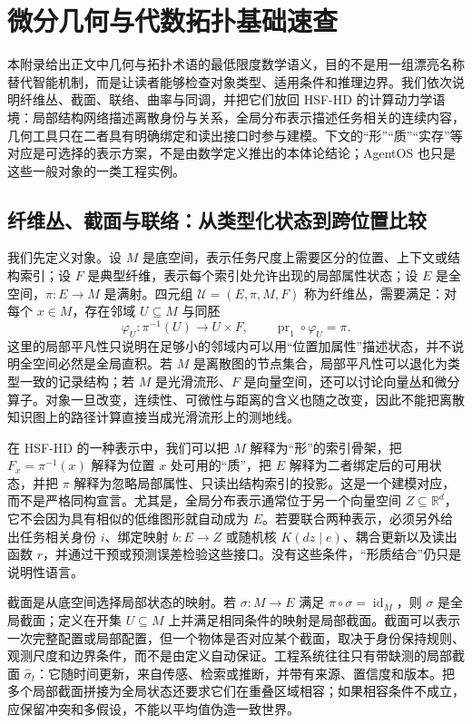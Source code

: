 \chapter{微分几何与代数拓扑基础速查}
\label{sec:section_4647}

本附录给出正文中几何与拓扑术语的最低限度数学语义，目的不是用一组漂亮名称替代智能机制，而是让读者能够检查对象类型、适用条件和推理边界。我们依次说明纤维丛、截面、联络、曲率与同调，并把它们放回 HSF-HD 的计算动力学语境：局部结构网络描述离散身份与关系，全局分布表示描述任务相关的连续内容，几何工具只在二者具有明确绑定和读出接口时参与建模。下文的“形”“质”“实存”等对应是可选择的表示方案，不是由数学定义推出的本体论结论；AgentOS 也只是这些一般对象的一类工程实例。

\section{纤维丛、截面与联络：从类型化状态到跨位置比较}

我们先定义对象。设 $M$ 是底空间，表示任务尺度上需要区分的位置、上下文或结构索引；设 $F$ 是典型纤维，表示每个索引处允许出现的局部属性状态；设 $E$ 是全空间，$\pi:E\to M$ 是满射。四元组 $\mathcal{U}=(E,\pi,M,F)$ 称为纤维丛，需要满足：对每个 $x\in M$，存在邻域 $U\subseteq M$ 与同胚
\[
  \varphi_U:\pi^{-1}(U)\longrightarrow U\times F,
  \qquad \operatorname{pr}_1\circ\varphi_U=\pi.
\]
这里的局部平凡性只说明在足够小的邻域内可以用“位置加属性”描述状态，并不说明全空间必然是全局直积。若 $M$ 是离散图的节点集合，局部平凡性可以退化为类型一致的记录结构；若 $M$ 是光滑流形、$F$ 是向量空间，还可以讨论向量丛和微分算子。对象一旦改变，连续性、可微性与距离的含义也随之改变，因此不能把离散知识图上的路径计算直接当成光滑流形上的测地线。

在 HSF-HD 的一种表示中，我们可以把 $M$ 解释为“形”的索引骨架，把 $F_x=\pi^{-1}(x)$ 解释为位置 $x$ 处可用的“质”，把 $E$ 解释为二者绑定后的可用状态，并把 $\pi$ 解释为忽略局部属性、只读出结构索引的投影。这是一个建模对应，而不是严格同构宣言。尤其是，全局分布表示通常位于另一个向量空间 $Z\subseteq\mathbb{R}^d$，它不会因为具有相似的低维图形就自动成为 $E$。若要联合两种表示，必须另外给出任务相关身份 $i$、绑定映射 $b:E\to Z$ 或随机核 $K(dz\mid e)$、耦合更新以及读出函数 $r$，并通过干预或预测误差检验这些接口。没有这些条件，“形质结合”仍只是说明性语言。

截面是从底空间选择局部状态的映射。若 $\sigma:M\to E$ 满足 $\pi\circ\sigma=\operatorname{id}_M$，则 $\sigma$ 是全局截面；定义在开集 $U\subseteq M$ 上并满足相同条件的映射是局部截面。截面可以表示一次完整配置或局部配置，但一个物体是否对应某个截面，取决于身份保持规则、观测尺度和边界条件，而不是由定义自动保证。工程系统往往只有带缺测的局部截面 $\hat\sigma_t$：它随时间更新，来自传感、检索或推断，并带有来源、置信度和版本。把多个局部截面拼接为全局状态还要求它们在重叠区域相容；如果相容条件不成立，应保留冲突和多假设，不能以平均值伪造一致世界。

